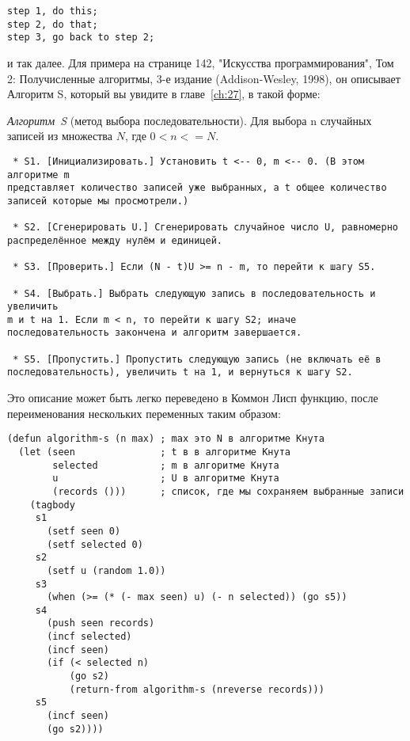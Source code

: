 \begin{verbatim}
step 1, do this; 
step 2, do that; 
step 3, go back to step 2;
\end{verbatim}

и так далее. Для примера на странице 142, "Искусства программирования", Том 2:
Получисленные алгоритмы, 3-е издание (Addison-Wesley, 1998), он описывает Алгоритм S,
который вы увидите в главе~\ref{ch:27}, в такой форме:

\textit{Алгоритм~S} (метод выбора последовательности). Для выбора n случайных записей из
множества $N$, где $0 < n <= N$.

\begin{lstlisting}
 * S1. [Инициализировать.] Установить t <-- 0, m <-- 0. (В этом алгоритме m 
представляет количество записей уже выбранных, а t общее количество 
записей которые мы просмотрели.)

 * S2. [Сгенерировать U.] Сгенерировать случайное число U, равномерно 
распределённое между нулём и единицей.

 * S3. [Проверить.] Если (N - t)U >= n - m, то перейти к шагу S5.

 * S4. [Выбрать.] Выбрать следующую запись в последовательность и увеличить
m и t на 1. Если m < n, то перейти к шагу S2; иначе 
последовательность закончена и алгоритм завершается.

 * S5. [Пропустить.] Пропустить следующую запись (не включать её в 
последовательность), увеличить t на 1, и вернуться к шагу S2.
\end{lstlisting}

Это описание может быть легко переведено в Коммон Лисп функцию, после переименования
нескольких переменных таким образом:

\begin{lstlisting}
(defun algorithm-s (n max) ; max это N в алгоритме Кнута
  (let (seen               ; t в в алгоритме Кнута
        selected           ; m в алгоритме Кнута
        u                  ; U в алгоритме Кнута
        (records ()))      ; список, где мы сохраняем выбранные записи
    (tagbody
     s1
       (setf seen 0)
       (setf selected 0)
     s2
       (setf u (random 1.0))
     s3
       (when (>= (* (- max seen) u) (- n selected)) (go s5))
     s4
       (push seen records)
       (incf selected)
       (incf seen)
       (if (< selected n)
           (go s2)
           (return-from algorithm-s (nreverse records)))
     s5
       (incf seen)
       (go s2))))
\end{lstlisting}


